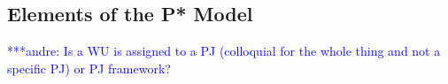 \documentclass[conference,final]{IEEEtran}
\newcommand{\jhanote}[1]{ {\textcolor{red} { ***shantenu: #1 }}}
\newcommand{\alnote}[1]{ {\textcolor{blue} { ***andre: #1 }}}
\newcommand{\alnote}[1]{}
\newcommand{\jhanote}[1]{}
\newcommand{\upp}{\vspace*{-0.5em}}
\begin{document}



\subsection{Elements of the P* Model \upp\upp}






\alnote{Is a WU is assigned to a PJ (colloquial for the whole thing
  and not a specific PJ) or PJ framework?}
\end{document}
